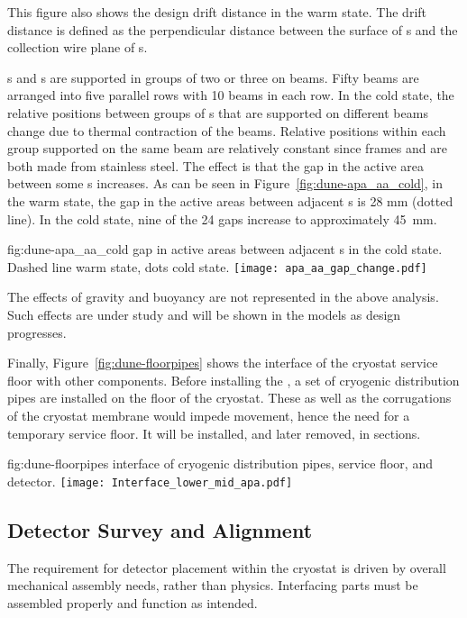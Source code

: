 This figure also shows the design drift distance in the warm
state. The drift distance is defined as the perpendicular distance
between the surface of s and the collection wire plane of
s.

s and s are supported in groups of two or three
on  beams. Fifty beams are arranged into five parallel
rows with 10 beams in each row.  In the cold state, the relative
positions between groups of s that are supported on
different beams change due to thermal contraction of the
beams. Relative positions within each group 
supported on the
same beam are relatively constant since  frames and 
 are both made from stainless steel.  The effect is that the gap
in the active area between some s increases.  As can be
seen in Figure~\ref{fig:dune-apa_aa_cold}, in the warm state, the gap
in the active areas between adjacent s is 28 mm (dotted
line). In the cold state, nine of the 24 gaps increase to
approximately 45~mm.
\begin{dunefigure}{fig:dune-apa_aa_cold} 
    { gap in active areas between adjacent s in the cold state. Dashed line warm state, dots cold state.}
\texttt{[image: apa\_aa\_gap\_change.pdf]}
\end{dunefigure}

The effects of gravity and buoyancy are not represented in the above
analysis. Such effects are under study and will be shown in the models
as design progresses.

Finally, Figure~\ref{fig:dune-floorpipes} shows the interface of the
cryostat service floor with other components.  Before installing the
, a set of cryogenic distribution pipes are installed
on the floor of the cryostat. These as well as the corrugations of the
cryostat membrane would impede movement, hence the need for
a temporary service floor. It will be installed, and later removed, in sections. 
\begin{dunefigure}{fig:dune-floorpipes}
{ interface of cryogenic distribution pipes, service floor, and detector.}
\texttt{[image: Interface\_lower\_mid\_apa.pdf]}
\end{dunefigure}

\subsection{Detector Survey and Alignment}
\label{sec:fdsp-coord-integ-survey}
The requirement for detector placement within the cryostat is driven
by overall mechanical assembly needs, rather than physics.
Interfacing parts must be assembled properly and function as intended.


